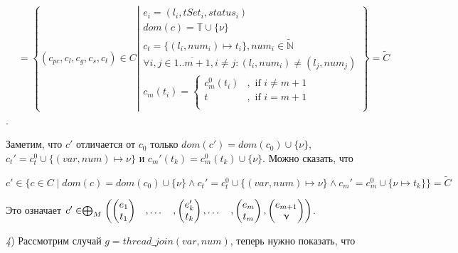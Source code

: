 \begin{align}
& = \left\lbrace (c_{pc},c_l,c_g,c_s, c_t) \in C 
\left| 
\begin{array}{c}
e_i = (l_i, tSet_i, status_i) \\
dom(c) = \mathbb{T} \cup \{\nu\}\\
c_t = \{(l_i, num_i) \mapsto t_i\}, num_i \in \tilde{\mathbb{N}} \\
\forall i, j \in \overline{1..m+1}, i \neq j: (l_i, num_i) \neq (l_j, num_j)\\
c_m(t_i) = \begin{cases}
c^0_m(t_i)&, \mbox{ if } i \neq m+1 \\
t&, \mbox{ if } i = m+1 \\
\end{cases}
\end{array}
\right.
\right\rbrace = \tilde{C} \nonumber 
\end{align}.

Заметим, что $c'$ отличается от $c_0$ только $dom(c') = dom(c_0) \cup \{\nu\}$, $c_t' = c^0_t \cup \{(var, num) \mapsto \nu\}$ и $c_m'(t_k) = c^0_m(t_k) \cup \{\nu\}$.
Можно сказать, что

$c' \in \{c \in C \mid dom(c) = dom(c_0)  \cup \{\nu\} \land c_t' = c^0_t \cup \{(var, num) \mapsto \nu\} \land c_m' = c^0_m \cup \{\nu \mapsto t_k\} \} = \tilde{C}$

Это означает $c' \in \mathrel{\bigoplus}_M
\begin{pmatrix}
\begin{pmatrix}
e_1 \\
t_1 
\end{pmatrix}& ,
\dots& ,
\begin{pmatrix}
e_k' \\
t_k 
\end{pmatrix},
\dots& ,
\begin{pmatrix}
e_m \\
t_m 
\end{pmatrix},
\begin{pmatrix}
e_{m+1} \\
\upnu 
\end{pmatrix}
\end{pmatrix}$.

{\textit 4)} Рассмотрим случай $g = thread\_join(var, num)$, теперь нужно показать, что

